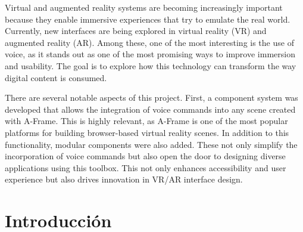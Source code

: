 \documentclass[a4paper, 12pt]{book}
\let\cleardoublepage\clearpage
\begin{document}
Virtual and augmented reality systems are becoming increasingly important because they enable immersive experiences that try to emulate the real world.
Currently, new interfaces are being explored in virtual reality (VR) and augmented reality (AR). Among these, one of the most interesting is the use of voice, as it stands out as one of the most promising ways to improve immersion and usability.
The goal is to explore how this technology can transform the way digital content is consumed.

There are several notable aspects of this project.
First, a component system was developed that allows the integration of voice commands into any scene created with A-Frame. This is highly relevant, as A-Frame is one of the most popular platforms for building browser-based virtual reality scenes.
In addition to this functionality, modular components were also added. These not only simplify the incorporation of voice commands but also open the door to designing diverse applications using this toolbox. This not only enhances accessibility and user experience but also drives innovation in VR/AR interface design.




\tableofcontents 
\cleardoublepage
\listoffigures %



\cleardoublepage
\chapter{Introducción}
\label{sec:intro} %
\end{document}
